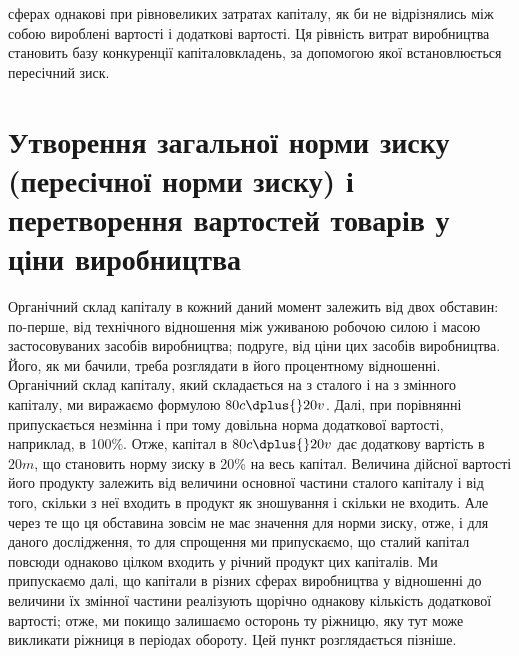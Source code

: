 \parcont{}  %
сферах однакові при рівновеликих затратах капіталу, як би не
відрізнялись між собою вироблені вартості і додаткові вартості.
Ця рівність витрат виробництва становить базу конкуренції капіталовкладень, за допомогою якої
встановлюється пересічний зиск.

\section{Утворення загальної норми зиску (пересічної норми зиску) і перетворення вартостей товарів у ціни
виробництва}

Органічний склад капіталу в кожний даний момент залежить
від двох обставин: по-перше, від технічного відношення між уживаною робочою силою і масою
застосовуваних засобів виробництва; подруге, від ціни цих засобів виробництва. Його, як ми бачили,
треба розглядати в його процентному відношенні. Органічний склад капіталу, який складається на  з
сталого і на  з змінного капіталу, ми виражаємо формулою $80 c \dplus{} 20 v$. Далі, при
порівнянні припускається незмінна і при тому довільна норма
додаткової вартості, наприклад, в 100\%. Отже, капітал в $80 c \dplus{} 20 v$ дає додаткову вартість в $20 m$,
що становить норму зиску
в 20\% на весь капітал. Величина дійсної вартості його продукту
залежить від величини основної частини сталого капіталу і від
того, скільки з неї входить в продукт як зношування і скільки
не входить. Але через те що ця обставина зовсім не має значення для норми зиску, отже, і для даного
дослідження, то для
спрощення ми припускаємо, що сталий капітал повсюди однаково цілком входить у річний продукт цих
капіталів. Ми припускаємо далі, що капітали в різних сферах виробництва у
відношенні до величини їх змінної частини реалізують щорічно
однакову кількість додаткової вартості; отже, ми покищо залишаємо осторонь ту ріжницю, яку тут може
викликати ріжниця
в періодах обороту. Цей пункт розглядається пізніше.

